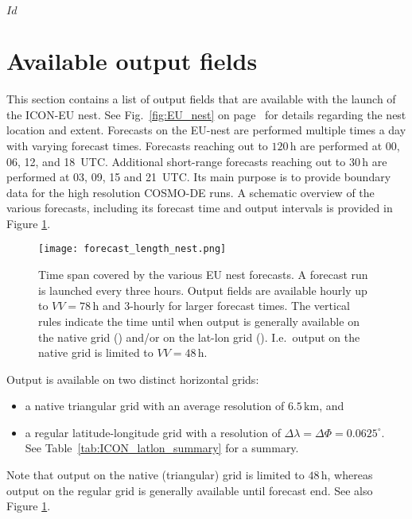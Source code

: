 \svnInfo $Id$


\section{Available output fields}\label{nest:sec_outfields}

This section contains a list of output fields that are available with
the launch of the ICON-EU nest. See Fig.~\ref{fig:EU_nest} on page~\pageref{fig:EU_nest} 
for details regarding the nest location and extent.
%
Forecasts on the EU-nest are performed multiple times a day with varying forecast times. Forecasts reaching out to $120\,\mathrm{h}$ 
are performed at 00, 06, 12, and 18~UTC. Additional short-range forecasts reaching out to $30\,\mathrm{h}$ are performed at 03, 09, 15 and 21~UTC. 
Its main purpose is to provide boundary data for the high resolution COSMO-DE runs. A schematic overview of the various forecasts, including its 
forecast time and output intervals is provided in Figure \ref{fig:forecast_length_nest}.
\begin{figure}[hbt]
 \centering
 \texttt{[image: forecast\_length\_nest.png]}
 \caption{Time span covered by the various EU nest forecasts. A forecast run is launched every three hours.
          Output fields are available hourly up to $VV=78\,\mathrm{h}$ and 3-hourly for larger forecast times. 
          The vertical rules indicate the time until when output is generally available on the native grid 
          (\protect\markRed) and/or on the lat-lon grid (\protect\markBlue). I.e.\ output on the native grid is 
          limited to $VV=48\,\mathrm{h}$.}\label{fig:forecast_length_nest}
\end{figure}

Output is available on two distinct horizontal grids: 
\begin{itemize}
  \item a native triangular grid with an average resolution of $6.5\,\mathrm{km}$, and
  \item a regular latitude-longitude grid with a resolution of $\Delta \lambda = \Delta \Phi=0.0625^{\circ}$.\\
    See Table~\ref{tab:ICON_latlon_summary} for a summary.
\end{itemize}
%
Note that output on the native (triangular) grid is limited to $48\,\mathrm{h}$, whereas output on the regular 
grid is generally available until forecast end. See also Figure \ref{fig:forecast_length_nest}.

